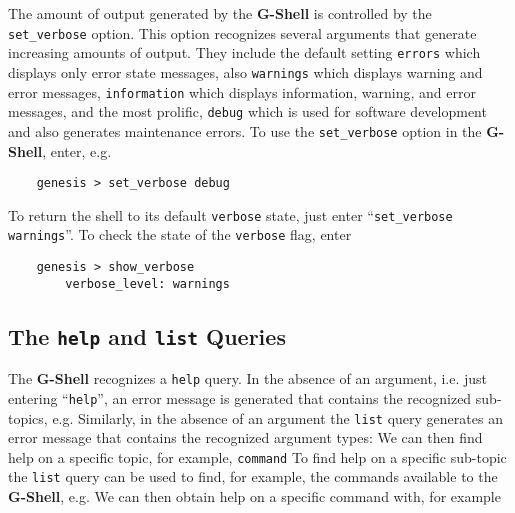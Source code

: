 \documentclass[12pt]{article}
\begin{document}
The amount of output generated by the {\bf G-Shell} is controlled by the {\tt set\_verbose} option.  This option recognizes several arguments that generate increasing amounts of output. They include the default setting {\tt errors} which displays only error state messages, also {\tt warnings} which displays warning and error messages, {\tt information} which displays information, warning, and error messages, and the most prolific, {\tt debug} which is used for software development and also generates maintenance errors. To use the {\tt set\_verbose} option in the {\bf G-Shell}, enter, e.g.
\begin{verbatim}
    genesis > set_verbose debug
\end{verbatim}
To return the shell to its default {\tt verbose} state, just enter ``{\tt set\_verbose warnings}''.  To check the state of the {\tt verbose} flag, enter
\begin{verbatim}
    genesis > show_verbose
        verbose_level: warnings
\end{verbatim}

\subsection*{The {\tt help} and {\tt list} Queries}
The {\bf G-Shell} recognizes a {\tt help} query. In the absence of an argument, i.e. just entering ``{\tt help}'', an error message is generated that contains the recognized sub-topics, e.g.
Similarly, in the absence of an argument the {\tt list} query generates an error message that contains the recognized argument types:
We can then find help on a specific topic, for example, {\tt command}
To find help on a specific sub-topic the {\tt list} query can be used to find, for example, the commands available to the {\bf G-Shell}, e.g.
We can then obtain help on a specific command with, for example
\end{document}
